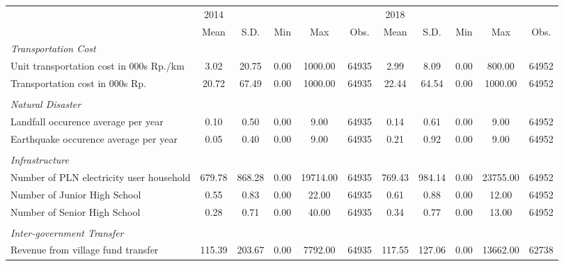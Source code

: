\begin{tabular}{l*{2}{ccccc}}
\toprule
                &     2014&         &         &         &         &     2018&         &         &         &         \\
                &     Mean&     S.D.&      Min&      Max&     Obs.&     Mean&     S.D.&      Min&      Max&     Obs.\\
\midrule
\emph{Transportation Cost}&         &         &         &         &         &         &         &         &         &         \\
\hspace{0.25cm} Unit transportation cost in 000s Rp./km&     3.02&    20.75&     0.00&  1000.00&    64935&     2.99&     8.09&     0.00&   800.00&    64952\\
\hspace{0.25cm} Transportation cost in 000s Rp.&    20.72&    67.49&     0.00&  1000.00&    64935&    22.44&    64.54&     0.00&  1000.00&    64952\\
\vspace{0.05em} \\ \emph{Natural Disaster}&         &         &         &         &         &         &         &         &         &         \\
\hspace{0.25cm} Landfall occurence average per year&     0.10&     0.50&     0.00&     9.00&    64935&     0.14&     0.61&     0.00&     9.00&    64952\\
\hspace{0.25cm} Earthquake occurence average per year&     0.05&     0.40&     0.00&     9.00&    64935&     0.21&     0.92&     0.00&     9.00&    64952\\
\vspace{0.05em} \\ \emph{Infrastructure}&         &         &         &         &         &         &         &         &         &         \\
\hspace{0.25cm} Number of PLN electricity user household&   679.78&   868.28&     0.00& 19714.00&    64935&   769.43&   984.14&     0.00& 23755.00&    64952\\
\hspace{0.25cm} Number of Junior High School&     0.55&     0.83&     0.00&    22.00&    64935&     0.61&     0.88&     0.00&    12.00&    64952\\
\hspace{0.25cm} Number of Senior High School&     0.28&     0.71&     0.00&    40.00&    64935&     0.34&     0.77&     0.00&    13.00&    64952\\
\vspace{0.05em} \\ \emph{Inter-government Transfer}&         &         &         &         &         &         &         &         &         &         \\
\hspace{0.25cm} Revenue from village fund transfer&   115.39&   203.67&     0.00&  7792.00&    64935&   117.55&   127.06&     0.00& 13662.00&    62738\\
\bottomrule
\end{tabular}
